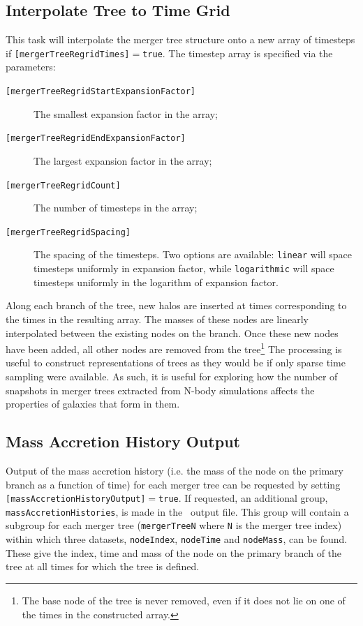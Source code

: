 \subsection{Interpolate Tree to Time Grid}\label{sec:MergerTreeTimeRegrid}

This task will interpolate the merger tree structure onto a new array of timesteps if {\tt [mergerTreeRegridTimes]}$=${\tt true}. The timestep array is specified via the parameters:
\begin{description}
\item[{\tt [mergerTreeRegridStartExpansionFactor]}] The smallest expansion factor in the array;
\item[{\tt [mergerTreeRegridEndExpansionFactor]}] The largest expansion factor in the array;
\item[{\tt [mergerTreeRegridCount]}] The number of timesteps in the array;
\item[{\tt [mergerTreeRegridSpacing]}] The spacing of the timesteps. Two options are available: {\tt linear} will space timesteps uniformly in expansion factor, while {\tt logarithmic} will space timesteps uniformly in the logarithm of expansion factor.
\end{description}
Along each branch of the tree, new halos are inserted at times corresponding to the times in the resulting array. The masses of these nodes are linearly interpolated between the existing nodes on the branch. Once these new nodes have been added, all other nodes are removed from the tree\footnote{The base node of the tree is never removed, even if it does not lie on one of the times in the constructed array.} The processing is useful to construct representations of trees as they would be if only sparse time sampling were available. As such, it is useful for exploring how the number of snapshots in merger trees extracted from N-body simulations affects the properties of galaxies that form in them.

\subsection{Mass Accretion History Output}

Output of the mass accretion history (i.e. the mass of the \gls{node} on the primary branch as a function of time) for each merger tree can be requested by setting {\tt [massAccretionHistoryOutput]}$=${\tt true}. If requested, an additional group, {\tt massAccretionHistories}, is made in the \glc\ output file. This group will contain a subgroup for each merger tree ({\tt mergerTreeN} where {\tt N} is the merger tree index) within which three datasets, {\tt nodeIndex}, {\tt nodeTime} and {\tt nodeMass}, can be found. These give the index, time and mass of the \gls{node} on the primary branch of the tree at all times for which the tree is defined.

